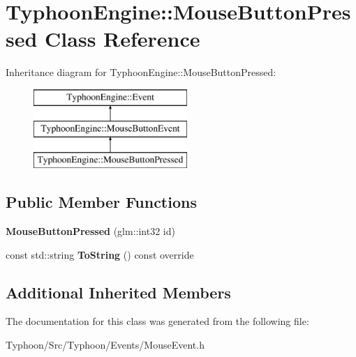 \hypertarget{class_typhoon_engine_1_1_mouse_button_pressed}{}\section{Typhoon\+Engine\+::Mouse\+Button\+Pressed Class Reference}
\label{class_typhoon_engine_1_1_mouse_button_pressed}
Inheritance diagram for Typhoon\+Engine\+::Mouse\+Button\+Pressed\+:\begin{figure}[H]
\begin{center}
\leavevmode
\includegraphics[height=3.000000cm]{class_typhoon_engine_1_1_mouse_button_pressed}
\end{center}
\end{figure}
\subsection*{Public Member Functions}
\begin{DoxyCompactItemize}
\item 
\mbox{\label{class_typhoon_engine_1_1_mouse_button_pressed_a96f788864af0bd7b596bdcffb4f0af13}} 
{\bfseries Mouse\+Button\+Pressed} (glm\+::int32 id)
\item 
\mbox{\label{class_typhoon_engine_1_1_mouse_button_pressed_a02d12c10c73461f44e76ec4442556047}} 
const std\+::string {\bfseries To\+String} () const override
\end{DoxyCompactItemize}
\subsection*{Additional Inherited Members}


The documentation for this class was generated from the following file\+:\begin{DoxyCompactItemize}
\item 
Typhoon/\+Src/\+Typhoon/\+Events/Mouse\+Event.\+h\end{DoxyCompactItemize}
